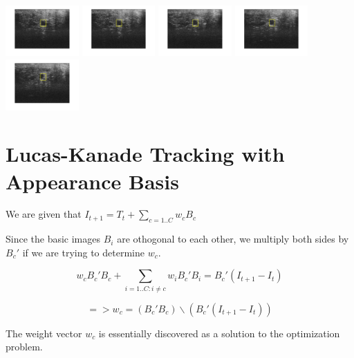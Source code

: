 \documentclass[12pt]{article}
\newenvironment{problem}[2][Problem]{\begin{trivlist}
\item[\hskip \labelsep {\bfseries #1}\hskip \labelsep {\bfseries #2.}]}{\end{trivlist}}
\begin{document}
\begin{problem}{1.4}
  \includegraphics[width=0.21\textwidth]{results/5_us_driftcorr}
  \includegraphics[width=0.21\textwidth]{results/25_us_driftcorr}
  \includegraphics[width=0.21\textwidth]{results/50_us_driftcorr}
  \includegraphics[width=0.21\textwidth]{results/75_us_driftcorr}  
  \includegraphics[width=0.21\textwidth]{results/100_us_driftcorr}  

\end{problem}
\newpage
\section{Lucas-Kanade Tracking with Appearance Basis}

\begin{problem}{2.1}

We are given that $I_{t+1} =T_t+ \sum_{c=1..C} w_c B_c$

Since the basic images $B_i$ are othogonal to each other, we multiply both sides by $B_c'$ if we are trying to determine $w_c$.

$$w_c B_c' B_c + \sum_{i=1..C:i \neq c} w_i B_c' B_i = B_c' (I_{t+1}-I_t)$$

$$=> w_c = (B_c' B_c) \backslash (B_c' (I_{t+1}-I_t))$$

The weight vector $w_c$ is essentially discovered as a solution to the optimization problem. 

\end{problem}
\end{document}
